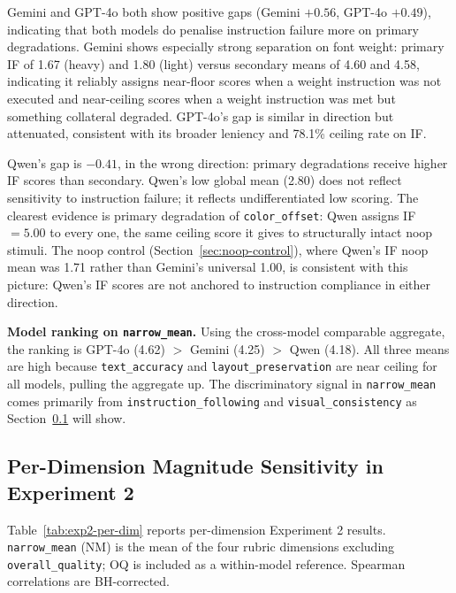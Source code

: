 Gemini and GPT-4o both show positive gaps (Gemini $+0.56$, GPT-4o $+0.49$), indicating that both models do penalise instruction failure more on primary degradations. Gemini shows especially strong separation on font weight: primary IF of 1.67 (heavy) and 1.80 (light) versus secondary means of 4.60 and 4.58, indicating it reliably assigns near-floor scores when a weight instruction was not executed and near-ceiling scores when a weight instruction was met but something collateral degraded. GPT-4o's gap is similar in direction but attenuated, consistent with its broader leniency and 78.1\% ceiling rate on IF.

Qwen's gap is $-0.41$, in the wrong direction: primary degradations receive higher IF scores than secondary. Qwen's low global mean (2.80) does not reflect sensitivity to instruction failure; it reflects undifferentiated low scoring. The clearest evidence is primary degradation of \texttt{color\_offset}: Qwen assigns IF $= 5.00$ to every one, the same ceiling score it gives to structurally intact noop stimuli. The noop control (Section~\ref{sec:noop-control}), where Qwen's IF noop mean was 1.71 rather than Gemini's universal 1.00, is consistent with this picture: Qwen's IF scores are not anchored to instruction compliance in either direction.

\textbf{Model ranking on \texttt{narrow\_mean}.} Using the cross-model comparable aggregate, the ranking is GPT-4o (4.62) $>$ Gemini (4.25) $>$ Qwen (4.18). All three means are high because \texttt{text\_accuracy} and \texttt{layout\_preservation} are near ceiling for all models, pulling the aggregate up. The discriminatory signal in \texttt{narrow\_mean} comes primarily from \texttt{instruction\_following} and \texttt{visual\_consistency} as Section~\ref{sec:per-dim-sensitivity} will show.

\subsection{Per-Dimension Magnitude Sensitivity in Experiment 2} \label{sec:per-dim-sensitivity}

Table~\ref{tab:exp2-per-dim} reports per-dimension Experiment 2 results. \texttt{narrow\_mean} (NM) is the mean of the four rubric dimensions excluding \texttt{overall\_quality}; OQ is included as a within-model reference. Spearman correlations are BH-corrected.


